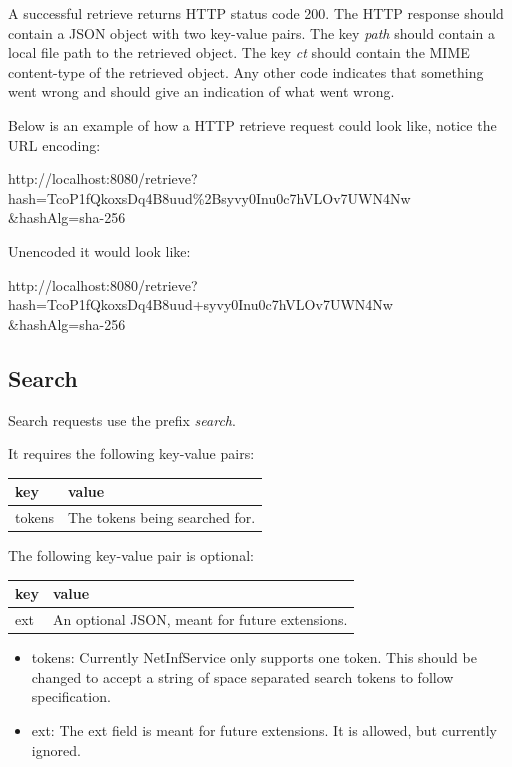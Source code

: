 A successful retrieve returns HTTP status code 200. The HTTP response should contain a JSON object with two key-value pairs. The key \emph{path} should contain a local file path to the retrieved object. The key \emph{ct} should contain the MIME content-type of the retrieved object. Any other code indicates that something went wrong and should give an indication of what went wrong.

Below is an example of how a HTTP retrieve request could look like, notice the URL encoding:

http://localhost:8080/retrieve?hash=TcoP1fQkoxsDq4B8uud\%2Bsyvy0Inu0c7hVLOv7UWN4Nw \\ \&hashAlg=sha-256

Unencoded it would look like:

http://localhost:8080/retrieve?hash=TcoP1fQkoxsDq4B8uud+syvy0Inu0c7hVLOv7UWN4Nw \\ \&hashAlg=sha-256

\subsection{Search}

Search requests use the prefix \emph{search}.

It requires the following key-value pairs:

\begin{tabular}{ | l | l | }
	\hline
	key & value  \\ \hline \hline
	tokens & The tokens being searched for.  \\ \hline
\end{tabular}

The following key-value pair is optional:

\begin{tabular}{ | l | l | }
	\hline
	key & value  \\ \hline \hline
	ext & An optional JSON, meant for future extensions. \\ \hline
\end{tabular}

\begin{itemize}
	\item tokens: Currently NetInfService only supports one token. This should be changed to accept a string of space separated search tokens to follow specification.
	\item ext: The ext field is meant for future extensions. It is allowed, but currently ignored.
 \end{itemize}

